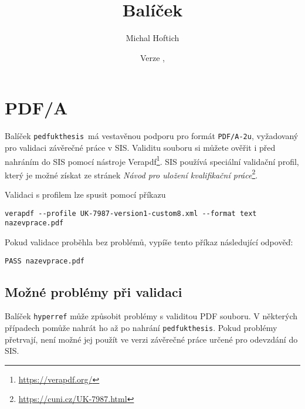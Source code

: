 \documentclass{ltxdoc}
\title{Balíček \pkgname}
\author{Michal Hoftich}
\date{Verze \version, \gitdate}
\newcommand\pkgname{\texttt{pedfukthesis}}
\begin{document}
\maketitle

\tableofcontents

\section{PDF/A}
Balíček \pkgname\ má vestavěnou podporu pro formát \texttt{PDF/A-2u},
vyžadovaný pro validaci závěrečné práce v SIS. Validitu souboru si můžete
ověřit i před nahráním do SIS pomocí nástroje
Verapdf\footnote{\url{https://verapdf.org/}}. SIS používá speciální validační
profil, který je možné získat ze stránek
\textit{Návod pro uložení kvalifikační práce}\footnote{\url{https://cuni.cz/UK-7987.html}}.

Validaci s profilem lze spusit pomocí příkazu

\begin{verbatim}
verapdf --profile UK-7987-version1-custom8.xml --format text nazevprace.pdf
\end{verbatim}

Pokud validace proběhla bez problémů, vypíše tento příkaz následující odpověď:

\begin{verbatim}
PASS nazevprace.pdf
\end{verbatim}

\subsection{Možné problémy při validaci}

Balíček \texttt{hyperref} může způsobit problémy s validitou PDF souboru. V některých případech
pomůže nahrát ho až po nahrání \pkgname. Pokud problémy přetrvají, není možné
jej použít ve verzi závěrečné práce určené pro odevzdání do SIS.
\end{document}

